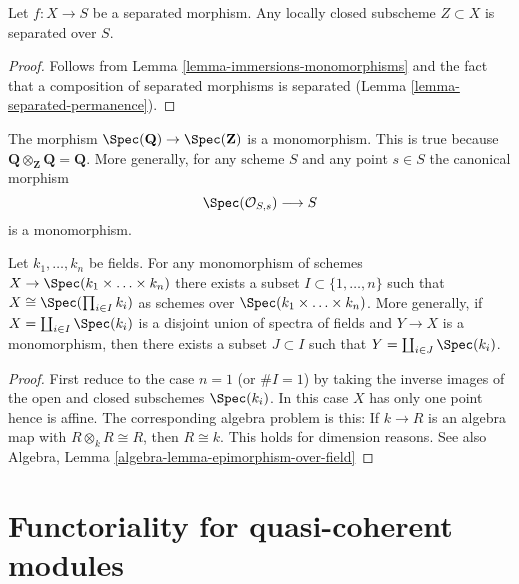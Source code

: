 \begin{lemma}
\label{lemma-subscheme-of-separated-scheme}
Let $f : X \to S$ be a separated morphism.
Any locally closed subscheme $Z \subset X$ is separated over $S$.
\end{lemma}

\begin{proof}
Follows from Lemma \ref{lemma-immersions-monomorphisms}
and the fact that a composition of separated morphisms is separated
(Lemma \ref{lemma-separated-permanence}).
\end{proof}

\begin{example}
\label{example-Q-over-Z}
The morphism $\Spec(\mathbf{Q}) \to \Spec(\mathbf{Z})$
is a monomorphism. This is true because
$\mathbf{Q} \otimes_{\mathbf{Z}} \mathbf{Q} = \mathbf{Q}$.
More generally, for any scheme $S$ and any point $s \in S$ the
canonical morphism
$$
\Spec(\mathcal{O}_{S, s}) \longrightarrow S
$$
is a monomorphism.
\end{example}

\begin{lemma}
\label{lemma-mono-towards-spec-field}
Let $k_1, \ldots, k_n$ be fields.
For any monomorphism of schemes
$X \to \Spec(k_1 \times \ldots \times k_n)$
there exists a subset $I \subset \{1, \ldots, n\}$ such
that $X \cong \Spec(\prod_{i \in I} k_i)$ as
schemes over $\Spec(k_1 \times \ldots \times k_n)$.
More generally, if $X = \coprod_{i \in I} \Spec(k_i)$
is a disjoint union of spectra of fields and $Y \to X$ is a monomorphism,
then there exists a subset $J \subset I$ such that
$Y = \coprod_{i \in J} \Spec(k_i)$.
\end{lemma}

\begin{proof}
First reduce to the case $n = 1$ (or $\# I = 1$)
by taking the inverse images of the
open and closed subschemes $\Spec(k_i)$.
In this case $X$ has only one point hence is affine.
The corresponding algebra problem is this:
If $k \to R$ is an algebra map
with $R \otimes_k R \cong R$, then $R \cong k$.
This holds for dimension reasons.
See also
Algebra, Lemma \ref{algebra-lemma-epimorphism-over-field}
\end{proof}










\section{Functoriality for quasi-coherent modules}
\label{section-quasi-coherent}

